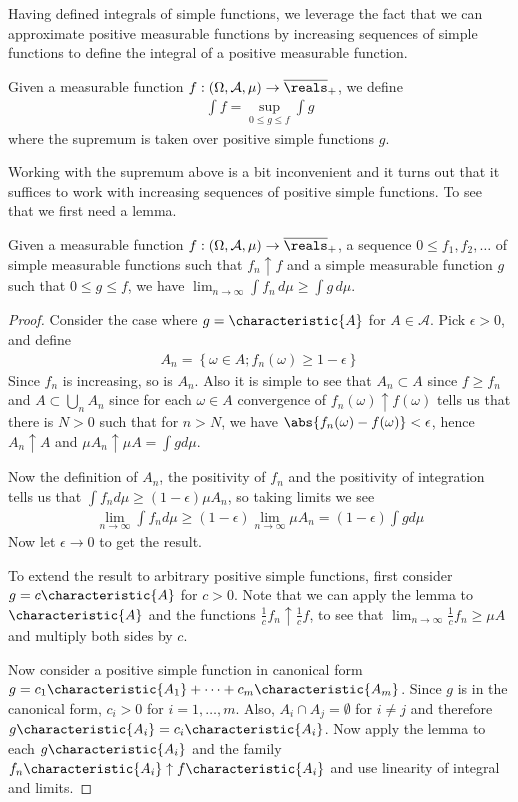 Having defined integrals of simple functions, we leverage the fact
that we can approximate positive measurable functions by increasing
sequences of simple functions to define the integral of a positive
measurable function.
\begin{defn}Given a measurable function $f : (\Omega, \mathcal{A},
  \mu) \to \overline{\reals}_+$, we define 
\begin{align*}\int f = \sup_{0 \leq g \leq f} \int g
\end{align*}
where the supremum is taken over positive simple functions $g$.
\end{defn}
Working with the supremum above is a bit inconvenient and it turns out
that it suffices to work with increasing sequences of positive simple
functions.  To see that we first need a lemma.
\begin{lem}Given a measurable function $f : (\Omega,
  \mathcal{A}, \mu) \to \overline{\reals}_+$, a sequence $0 \leq f_1, f_2, \dots$ of simple measurable
  functions such that $f_n \uparrow f$ and a simple measurable
  function $g$ such that $0 \leq g \leq f$, we have $\lim_{n \to \infty} \int f_n
  \, d\mu
  \geq \int g \, d\mu$.
\end{lem}
\begin{proof}Consider the case where $g = \characteristic{A}$ for $A
  \in \mathcal{A}$.  Pick $\epsilon > 0$, and define
\begin{align*}
A_n = \left \{ \omega \in A; f_n(\omega) \geq 1 - \epsilon \right \}
\end{align*}
Since $f_n$ is increasing, so is $A_n$.  Also it is simple to see that
$A_n \subset A$ since $f \geq f_n$ and $A \subset \bigcup_n A_n$ since
for each $\omega \in A$ convergence of $f_n(\omega) \uparrow
f(\omega)$ tells us that there is $N > 0$ such that for $n > N$, we
have $\abs{f_n(\omega) - f(\omega)} < \epsilon$, hence $A_n \uparrow
A$ and 
$\mu A_n \uparrow \mu A = \int g d \mu$.

Now the definition of $A_n$, the positivity of $f_n$ and the
positivity of integration tells us that
$\int f_n d \mu \geq (1 - \epsilon) \mu A_n$, so taking limits we see
\begin{align*}
\lim_{n \to \infty} \int f_n d \mu \geq (1 - \epsilon) \lim_{n \to
  \infty} \mu A_n = (1-\epsilon) \int g d \mu
\end{align*}
Now let $\epsilon \to 0$ to get the result.

To extend the result to arbitrary positive simple functions,  first consider $g
= c \characteristic{A}$ for $c > 0$.  Note that we can apply the
lemma to $\characteristic{A}$ and the functions $\frac{1}{c}f_n
\uparrow \frac{1}{c}f$, to see that $\lim_{n \to \infty}
\frac{1}{c}f_n \geq \mu A$ and multiply both sides by $c$.

Now consider a positive simple function in canonical form $g = c_1
\characteristic{A_1} + \cdots + c_m \characteristic{A_m}$.  Since $g$
is in the canonical form, $c_i > 0$ for $i=1, \dots, m$.  Also, $A_i \cap A_j = \emptyset$ for $i \neq j$
and therefore $g \characteristic{A_i}  = c_i \characteristic{A_i}$.
Now apply the lemma to each $g \characteristic{A_i} $ and the family
$f_n \characteristic{A_i}  \uparrow f \characteristic{A_i} $ and use
linearity of integral and limits.
\end{proof}

